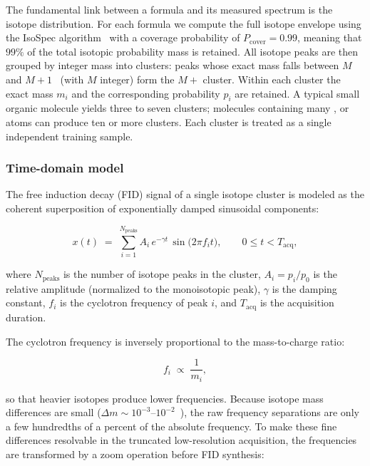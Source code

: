 \documentclass[12pt,a4paper]{report}
\begin{document}
The fundamental link between a formula and its measured spectrum is the isotope
distribution.  For each formula we compute the full isotope envelope using the
IsoSpec algorithm~\cite{isospec} with a coverage probability of
$P_{\mathrm{cover}} = 0.99$, meaning that $99\%$ of the total isotopic
probability mass is retained.  All isotope peaks are then grouped by integer mass
into clusters: peaks whose exact mass falls between $M$ and $M+1$~\ce{} (with
$M$ integer) form the $M+$ cluster.  Within each cluster the exact mass $m_i$
and the corresponding probability $p_i$ are retained.  A typical small organic
molecule yields three to seven clusters; molecules containing many ,
 or  atoms can produce ten or more clusters.  Each cluster is
treated as a single independent training sample.

\subsubsection{Time-domain model}
The free induction decay (FID) signal of a single isotope cluster is modeled as
the coherent superposition of exponentially damped sinusoidal components:

\begin{equation}
  x(t) \;=\; \sum_{i=1}^{N_{\mathrm{peaks}}}
  A_i \, e^{-\gamma t} \, \sin\!\bigl(2\pi f_i t\bigr),
  \qquad
  0 \le t < T_{\mathrm{acq}},
  \label{eq:fid_model}
\end{equation}

where $N_{\mathrm{peaks}}$ is the number of isotope peaks in the cluster,
$A_i = p_i / p_0$ is the relative amplitude (normalized to the monoisotopic
peak), $\gamma$ is the damping constant, $f_i$ is the cyclotron frequency of
peak $i$, and $T_{\mathrm{acq}}$ is the acquisition duration.

The cyclotron frequency is inversely proportional to the mass-to-charge ratio:

\begin{equation}
  f_i \;\propto\; \frac{1}{m_i},
  \label{eq:cyclotron_freq}
\end{equation}

so that heavier isotopes produce lower frequencies.  Because isotope mass
differences are small ($\Delta m \sim 10^{-3}$--$10^{-2}$~\ce{}), the raw
frequency separations are only a few hundredths of a percent of the absolute
frequency.  To make these fine differences resolvable in the truncated
low-resolution acquisition, the frequencies are transformed by a zoom operation
before FID synthesis:
\end{document}
